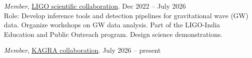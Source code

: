 \begin{itemize}[noitemsep]
    {
    \item \emph{Member}, {\href{https://roster.ligo.org/roster.php?do=member&uid=6935&search=group&target=64&order=group}{LIGO scientific collaboration}}. \hfill Dec 2022 -- July 2026\\
    Role: Develop inference tools and detection pipelines for gravitational wave (GW) data. Organize workshops on GW data analysis. Part of the LIGO-India Education and Public Outreach program. Design science demonstrations.

    \item \emph{Member}, {\href{https://gwwiki.icrr.u-tokyo.ac.jp/JGWwiki/KAGRA/KSC}{KAGRA collaboration}}. \hfill July 2026 -- present
    }\end{itemize}
    